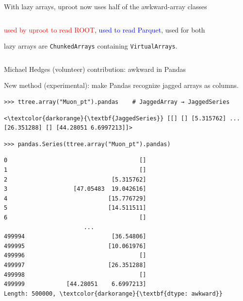 \documentclass[aspectratio=169]{beamer}
\begin{document}
\begin{frame}{With lazy arrays, uproot now uses half of the awkward-array classes}
\begin{columns}
\vspace{-0.25 cm}
\begin{center}
\begin{minipage}{0.63\linewidth}
\small
\textcolor{red}{used by uproot to read ROOT}, \textcolor{blue}{used to read Parquet}, \textcolor{mauve}{used for both}

lazy arrays are \texttt{ChunkedArrays} containing \texttt{VirtualArrays}.
\end{minipage}
\end{center}
\end{columns}
\end{frame}

\begin{frame}[fragile]{Michael Hedges (volunteer) contribution: awkward in Pandas}
\large
\vspace{0.25 cm}

New method (experimental): make Pandas recognize jagged arrays as columns.

\small
\begin{verbatim}
>>> ttree.array("Muon_pt").pandas    # JaggedArray → JaggedSeries
\end{verbatim}
\scriptsize\color{darkblue}\vspace{-0.75\baselineskip}\begin{Verbatim}[commandchars=\\\{\}]
<\textcolor{darkorange}{\textbf{JaggedSeries}} [[] [] [5.315762] ... [26.351288] [] [44.28051 6.6997213]]>
\end{Verbatim}
\color{black}

\small
\begin{verbatim}
>>> pandas.Series(ttree.array("Muon_pt").pandas)
\end{verbatim}
\scriptsize\color{darkblue}\vspace{-0.75\baselineskip}\begin{Verbatim}[commandchars=\\\{\}]
0                                      []
1                                      []
2                              [5.315762]
3                   [47.05483  19.042616]
4                             [15.776729]
5                             [14.511511]
6                                      []
                       ...               
499994                         [36.54806]
499995                        [10.061976]
499996                                 []
499997                        [26.351288]
499998                                 []
499999            [44.28051    6.6997213]
Length: 500000, \textcolor{darkorange}{\textbf{dtype: awkward}}
\end{Verbatim}
\end{frame}
\end{document}
